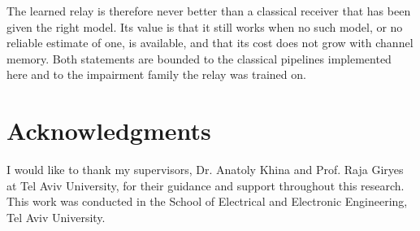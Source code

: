 The learned relay is therefore never better than a classical receiver that has been given the right model. Its value is that it still works when no such model, or no reliable estimate of one, is available, and that its cost does not grow with channel memory. Both statements are bounded to the classical pipelines implemented here and to the impairment family the relay was trained on.


\clearpage

\cleardoublepage
{}
\chapter*{Acknowledgments}

I would like to thank my supervisors, Dr. Anatoly Khina and Prof. Raja Giryes at Tel Aviv University, for their guidance and support throughout this research.
This work was conducted in the School of Electrical and Electronic Engineering, Tel Aviv University.

